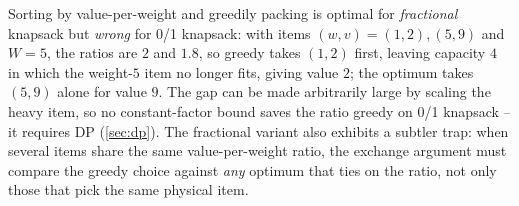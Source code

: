 \begin{remark}
Sorting by value-per-weight and greedily packing is optimal for \emph{fractional} knapsack but \emph{wrong} for 0/1 knapsack: with items $(w,v) = (1,2), (5,9)$ and $W=5$, the ratios are $2$ and $1.8$, so greedy takes $(1,2)$ first, leaving capacity $4$ in which the weight-$5$ item no longer fits, giving value $2$; the optimum takes $(5,9)$ alone for value $9$. The gap can be made arbitrarily large by scaling the heavy item, so no constant-factor bound saves the ratio greedy on 0/1 knapsack -- it requires DP (\cref{sec:dp}). The fractional variant also exhibits a subtler trap: when several items share the same value-per-weight ratio, the exchange argument must compare the greedy choice against \emph{any} optimum that ties on the ratio, not only those that pick the same physical item.
\end{remark}

